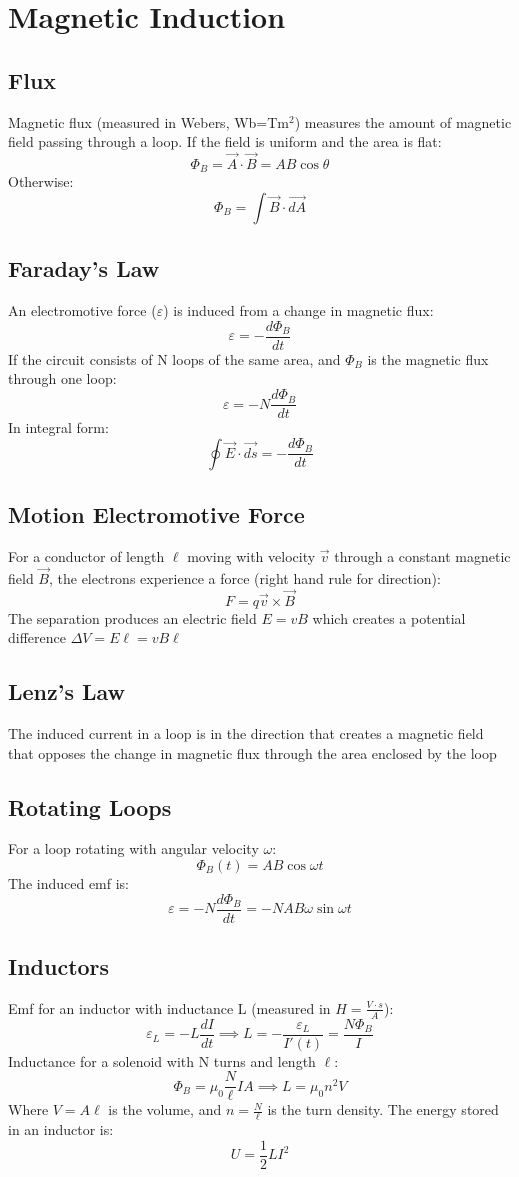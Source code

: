 \section{Magnetic Induction}
\subsection{Flux}
Magnetic flux (measured in Webers, Wb=Tm$^2$) measures the amount of magnetic field passing through a loop. If the field is uniform and the area is flat:
$$\Phi_B = \vec{A}\cdot\vec{B}=AB\cos{\theta}$$
Otherwise:
$$\Phi_B = \int\vec{B}\cdot \vec{dA}$$
\subsection{Faraday's Law}
An electromotive force ($\varepsilon$) is induced from a change in magnetic flux:
$$\varepsilon = -\frac{d\Phi_B}{dt}$$
If the circuit consists of N loops of the same area, and $\Phi_B$ is the magnetic flux through one loop:
$$\varepsilon = -N\frac{d\Phi_B}{dt}$$
In integral form:
$$\oint \vec{E}\cdot \vec{ds}=-\frac{d\Phi_B}{dt}$$
\subsection{Motion Electromotive Force}
For a conductor of length $\ell$ moving with velocity $\vec{v}$ through a constant magnetic field $\vec{B}$, the electrons experience a force (right hand rule for direction):
$$F=q\vec{v}\times\vec{B}$$
The separation produces an electric field $E=vB$ which creates a potential difference $\Delta V=E\ell=vB\ell$
\subsection{Lenz's Law}
The induced current in a loop is in the direction that creates a magnetic field that opposes the change in magnetic flux through the area enclosed by the loop
\subsection{Rotating Loops}
For a loop rotating with angular velocity $\omega$:
$$\Phi_B(t)=AB\cos{\omega t}$$ 
The induced emf is:
$$\varepsilon=-N\frac{d\Phi_B}{dt}=-NAB\omega\sin{\omega t}$$
\subsection{Inductors}
Emf for an inductor with inductance L (measured in $H=\frac{V\cdot s}{A}$):
$$\varepsilon_L=-L\frac{dI}{dt}\implies L=-\frac{\varepsilon_L}{I'(t)}=\frac{N\Phi_B}{I}$$
Inductance for a solenoid with N turns and length $\ell$:
$$\Phi_B=\mu_0\frac{N}{\ell}IA\implies L=\mu_0n^2V$$
Where $V=A\ell$ is the volume, and $n=\frac{N}{\ell}$ is the turn density. The energy stored in an inductor is:
$$U=\frac{1}{2}LI^2$$

